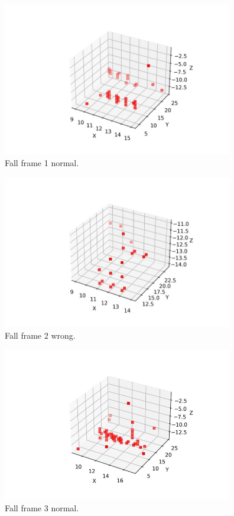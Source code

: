 \begin{figure}[H]
    \centering
    \includegraphics[width=380px, keepaspectratio=true]{appendix3.jpg}
    \caption{Fall frame 1 normal.}
    \label{fig:my_label}
\end{figure}

\begin{figure}[H]
    \centering
    \includegraphics[width=380px, keepaspectratio=true]{appendix4.jpg}
    \caption{Fall frame 2 wrong.}
    \label{fig:my_label}
\end{figure}

\begin{figure}[H]
    \centering
    \includegraphics[width=380px, keepaspectratio=true]{appendix5.jpg}
    \caption{Fall frame 3 normal.}
    \label{fig:my_label}
\end{figure}

